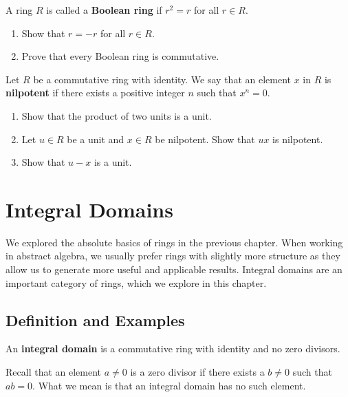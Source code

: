\begin{problem}
    A ring $R$ is called a \textbf{Boolean ring} if $r^2 = r$ for all $r \in R$.
    \begin{enumerate}[label=(\roman*)]
        \item Show that $r = -r$ for all $r \in R$.
        \item Prove that every Boolean ring is commutative.
    \end{enumerate}
\end{problem}

\begin{problem}
    Let $R$ be a commutative ring with identity. We say that an element $x$ in $R$ is \textbf{nilpotent} if there exists a positive integer $n$ such that $x^n = 0$.
    \begin{enumerate}[label=(\roman*)]
        \item Show that the product of two units is a unit.
        \item Let $u \in R$ be a unit and $x \in R$ be nilpotent. Show that $ux$ is nilpotent.
        \item Show that $u - x$ is a unit.
    \end{enumerate}
\end{problem}

\chapter{Integral Domains}
We explored the absolute basics of rings in the previous chapter. When working in abstract algebra, we usually prefer rings with slightly more structure as they allow us to generate more useful and applicable results. Integral domains are an important category of rings, which we explore in this chapter.

\section{Definition and Examples}
\begin{definition}
    An \textbf{integral domain} is a commutative ring with identity and no zero divisors.
\end{definition}
Recall that an element $a \neq 0$ is a zero divisor if there exists a $b \neq 0$ such that $ab = 0$. What we mean is that an integral domain has no such element.

